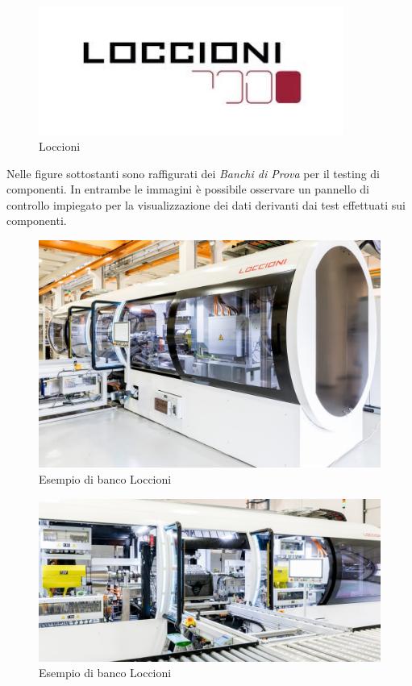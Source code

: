 \begin{figure}[h!]
\begin{center}
  \includegraphics[width=10cm]{images/loccioni.jpg}
 \caption{Loccioni}
\end{center}
\end{figure}

\pagebreak
Nelle figure sottostanti sono raffigurati dei \textit{Banchi di Prova} per il testing di componenti. In entrambe le immagini è possibile osservare un pannello di controllo impiegato per la visualizzazione dei dati derivanti dai test effettuati sui componenti.
\begin{figure}[h!]
\begin{center}
  \includegraphics[width=15cm]{images/banco.jpg}
 \caption{Esempio di banco Loccioni}
 \label{fig:bancoLoccioni}
\end{center}
\end{figure}
\begin{figure}[h!]
\begin{center}
  \includegraphics[width=15cm]{images/linea.jpg}
 \caption{Esempio di banco Loccioni}
 \label{fig:dashLoccioni}
\end{center}
\end{figure}

